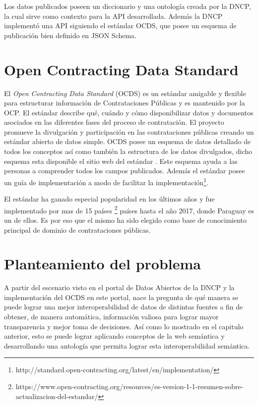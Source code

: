 Los datos publicados poseen un diccionario y una ontología creada por la DNCP, la cual sirve como contexto para la API desarrollada. Además la DNCP implementó una API siguiendo el estándar OCDS, que posee un esquema de publicación bien definido en JSON Schema.


\section{Open Contracting Data Standard}
\label{section:OCDS}

El \textit{Open Contracting Data Standard} (OCDS) es un estándar amigable y flexible para estructurar información de Contrataciones Públicas y es mantenido por la OCP. El estándar describe qué, cuándo y cómo disponibilizar datos y documentos asociados en las diferentes fases del proceso de contratación. El proyecto promueve la divulgación y participación en las contrataciones públicas creando un estándar abierto de datos simple. OCDS posee un esquema de datos detallado de todos los conceptos así como también la estructura de los datos divulgados, dicho esquema esta disponible el sitio web del estándar \cite{OCDSReleaseSchema:online}. Este esquema ayuda a las personas a comprender todos los campos publicados. Además el estándar posee un guía de implementación a modo de facilitar la implementación\footnote{http://standard.open-contracting.org/latest/en/implementation/}.

El estándar ha ganado especial popularidad en los últimos años y fue implementado por mas de 15 países \footnote{https://www.open-contracting.org/resources/es-version-1-1-resumen-sobre-actualizacion-del-estandar/} países hasta el año 2017, donde Paraguay es un de ellos. Es por eso que el mismo ha sido elegido como base de conocimiento principal de dominio de contrataciones públicas.

\section{Planteamiento del problema}
\label{section:planteamientoDelProblema}

A partir del escenario visto en el portal de Datos Abiertos de la DNCP y la implementación del OCDS en este portal, nace la pregunta de qué manera se puede lograr una mejor interoperabilidad de datos de distintas fuentes a fin de obtener, de manera automática, información valiosa para lograr mayor transparencia y mejor toma de decisiones. Así como lo mostrado en el capitulo anterior, esto se puede lograr aplicando conceptos de la web semántica y desarrollando una antología que permita lograr esta interoperabilidad semántica. 

